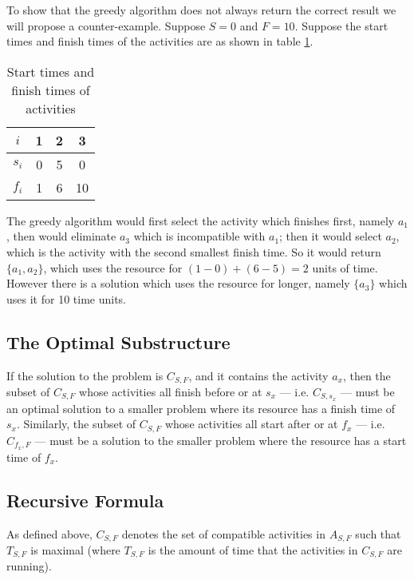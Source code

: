 \documentclass{article}
\begin{document}
To show that the greedy algorithm does not always return the correct result we will propose a counter-example. Suppose \(S = 0\) and \(F = 10\). Suppose the start times and finish times of the activities are as shown in table \ref{q3b-1}.

\begin{table}[hbtp]
	\centering
	\begin{tabular}{|c|ccc|}
		\hline
		\(i\)   & 1 & 2 & 3 \\
		\hline
		\(s_i\) & 0 & 5 & 0 \\
		\(f_i\) & 1 & 6 & 10 \\
		\hline
	\end{tabular}
	\caption{Start times and finish times of activities}
	\label{q3b-1}
\end{table}

The greedy algorithm would first select the activity which finishes first, namely \(a_1\), then would eliminate \(a_3\) which is incompatible with \(a_1\); then it would select \(a_2\), which is the activity with the second smallest finish time. So it would return \(\{a_1, a_2\}\), which uses the resource for \((1 - 0) + (6 - 5) = 2\) units of time. However there is a solution which uses the resource for longer, namely \(\{a_3\}\) which uses it for 10 time units.

\subsection{The Optimal Substructure}

If the solution to the problem is \(C_{S,F}\), and it contains the activity \(a_x\), then the subset of \(C_{S,F}\) whose activities all finish before or at \(s_x\) --- i.e. \(C_{S,s_x}\) --- must be an optimal solution to a smaller problem where its resource has a finish time of \(s_x\). Similarly, the subset of \(C_{S,F}\) whose activities all start after or at \(f_x\) --- i.e. \(C_{f_x,F}\) --- must be a solution to the smaller problem where the resource has a start time of \(f_x\).

\subsection{Recursive Formula}

As defined above, \(C_{S,F}\) denotes the set of compatible activities in \(A_{S,F}\) such that \(T_{S,F}\) is maximal (where \(T_{S,F}\) is the amount of time that the activities in \(C_{S,F}\) are running).
\end{document}
